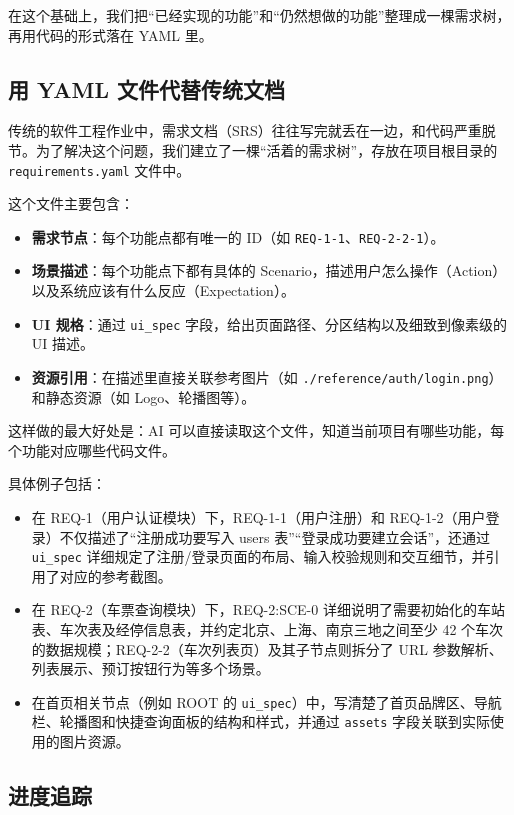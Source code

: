 \documentclass{article}
\begin{document}
在这个基础上，我们把“已经实现的功能”和“仍然想做的功能”整理成一棵需求树，再用代码的形式落在 YAML 里。

\subsection{用 YAML 文件代替传统文档}

传统的软件工程作业中，需求文档（SRS）往往写完就丢在一边，和代码严重脱节。为了解决这个问题，我们建立了一棵“活着的需求树”，存放在项目根目录的 \texttt{requirements.yaml} 文件中。

这个文件主要包含：
\begin{itemize}
    \item \textbf{需求节点}：每个功能点都有唯一的 ID（如 \texttt{REQ-1-1}、\texttt{REQ-2-2-1}）。
    \item \textbf{场景描述}：每个功能点下都有具体的 Scenario，描述用户怎么操作（Action）以及系统应该有什么反应（Expectation）。
    \item \textbf{UI 规格}：通过 \texttt{ui\_spec} 字段，给出页面路径、分区结构以及细致到像素级的 UI 描述。
    \item \textbf{资源引用}：在描述里直接关联参考图片（如 \texttt{./reference/auth/login.png}）和静态资源（如 Logo、轮播图等）。
\end{itemize}

这样做的最大好处是：AI 可以直接读取这个文件，知道当前项目有哪些功能，每个功能对应哪些代码文件。

具体例子包括：
\begin{itemize}
    \item 在 REQ-1（用户认证模块）下，REQ-1-1（用户注册）和 REQ-1-2（用户登录）不仅描述了“注册成功要写入 users 表”“登录成功要建立会话”，还通过 \texttt{ui\_spec} 详细规定了注册/登录页面的布局、输入校验规则和交互细节，并引用了对应的参考截图。
    \item 在 REQ-2（车票查询模块）下，REQ-2:SCE-0 详细说明了需要初始化的车站表、车次表及经停信息表，并约定北京、上海、南京三地之间至少 42 个车次的数据规模；REQ-2-2（车次列表页）及其子节点则拆分了 URL 参数解析、列表展示、预订按钮行为等多个场景。
    \item 在首页相关节点（例如 ROOT 的 \texttt{ui\_spec}）中，写清楚了首页品牌区、导航栏、轮播图和快捷查询面板的结构和样式，并通过 \texttt{assets} 字段关联到实际使用的图片资源。
\end{itemize}

\subsection{进度追踪}
\end{document}
